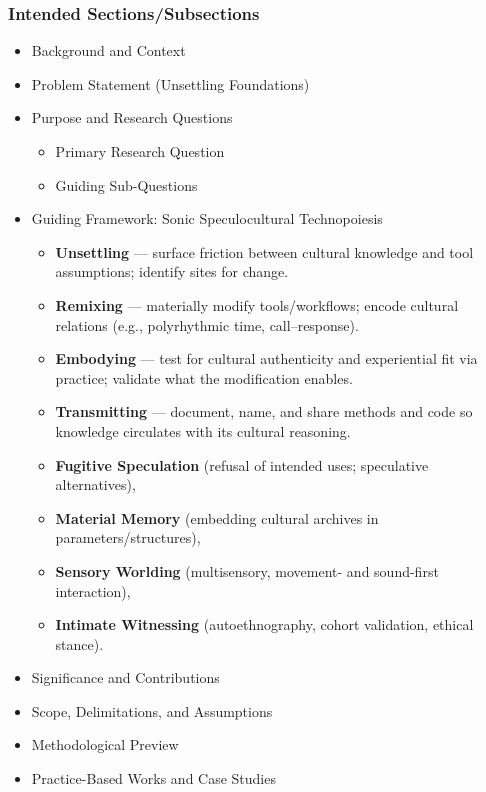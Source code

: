 \subsubsection{Intended Sections/Subsections}
\begin{itemize}[nosep]
	\item Background and Context
	\item Problem Statement (Unsettling Foundations)
	\item Purpose and Research Questions
		\begin{itemize}[nosep]
			\item Primary Research Question
			\item Guiding Sub-Questions
		\end{itemize}
	\item Guiding Framework: Sonic Speculocultural Technopoiesis
		\begin{itemize}[nosep]
			\item \textbf{Unsettling} — surface friction between cultural knowledge and tool assumptions; identify sites for change.
			\item \textbf{Remixing} — materially modify tools/workflows; encode cultural relations (e.g., polyrhythmic time, call–response).
			\item \textbf{Embodying} — test for cultural authenticity and experiential fit via practice; validate what the modification enables.
			\item \textbf{Transmitting} — document, name, and share methods and code so knowledge circulates with its cultural reasoning.
		\end{itemize}
		\begin{itemize}[nosep]
			\item \textbf{Fugitive Speculation} (refusal of intended uses; speculative alternatives),
			\item \textbf{Material Memory} (embedding cultural archives in parameters/structures),
			\item \textbf{Sensory Worlding} (multisensory, movement- and sound-first interaction),
			\item \textbf{Intimate Witnessing} (autoethnography, cohort validation, ethical stance).
		\end{itemize}
	\item Significance and Contributions
	\item Scope, Delimitations, and Assumptions
	\item Methodological Preview
	\item Practice-Based Works and Case Studies
\end{itemize}
